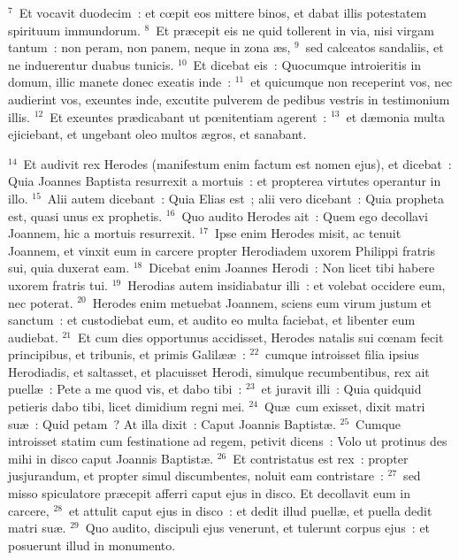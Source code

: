 ${}^{7}$~Et vocavit duodecim~: et cœpit eos mittere binos, et dabat illis potestatem spirituum immundorum.
${}^{8}$~Et pr\ae cepit eis ne quid tollerent in via, nisi virgam tantum~: non peram, non panem, neque in zona \ae s,
${}^{9}$~sed calceatos sandaliis, et ne induerentur duabus tunicis.
${}^{10}$~Et dicebat eis~: Quocumque introieritis in domum, illic manete donec exeatis inde~:
${}^{11}$~et quicumque non receperint vos, nec audierint vos, exeuntes inde, excutite pulverem de pedibus vestris in testimonium illis.
${}^{12}$~Et exeuntes pr\ae dicabant ut pœnitentiam agerent~:
${}^{13}$~et d\ae monia multa ejiciebant, et ungebant oleo multos \ae gros, et sanabant.


${}^{14}$~Et audivit rex Herodes (manifestum enim factum est nomen ejus), et dicebat~: Quia Joannes Baptista resurrexit a mortuis~: et propterea virtutes operantur in illo.
${}^{15}$~Alii autem dicebant~: Quia Elias est~; alii vero dicebant~: Quia propheta est, quasi unus ex prophetis.
${}^{16}$~Quo audito Herodes ait~: Quem ego decollavi Joannem, hic a mortuis resurrexit.
${}^{17}$~Ipse enim Herodes misit, ac tenuit Joannem, et vinxit eum in carcere propter Herodiadem uxorem Philippi fratris sui, quia duxerat eam.
${}^{18}$~Dicebat enim Joannes Herodi~: Non licet tibi habere uxorem fratris tui.
${}^{19}$~Herodias autem insidiabatur illi~: et volebat occidere eum, nec poterat.
${}^{20}$~Herodes enim metuebat Joannem, sciens eum virum justum et sanctum~: et custodiebat eum, et audito eo multa faciebat, et libenter eum audiebat.
${}^{21}$~Et cum dies opportunus accidisset, Herodes natalis sui cœnam fecit principibus, et tribunis, et primis Galil\ae \ae~:
${}^{22}$~cumque introisset filia ipsius Herodiadis, et saltasset, et placuisset Herodi, simulque recumbentibus, rex ait puell\ae~: Pete a me quod vis, et dabo tibi~:
${}^{23}$~et juravit illi~: Quia quidquid petieris dabo tibi, licet dimidium regni mei.
${}^{24}$~Qu\ae\ cum exisset, dixit matri su\ae~: Quid petam~? At illa dixit~: Caput Joannis Baptist\ae .
${}^{25}$~Cumque introisset statim cum festinatione ad regem, petivit dicens~: Volo ut protinus des mihi in disco caput Joannis Baptist\ae .
${}^{26}$~Et contristatus est rex~: propter jusjurandum, et propter simul discumbentes, noluit eam contristare~:
${}^{27}$~sed misso spiculatore pr\ae cepit afferri caput ejus in disco. Et decollavit eum in carcere,
${}^{28}$~et attulit caput ejus in disco~: et dedit illud puell\ae , et puella dedit matri su\ae .
${}^{29}$~Quo audito, discipuli ejus venerunt, et tulerunt corpus ejus~: et posuerunt illud in monumento.


